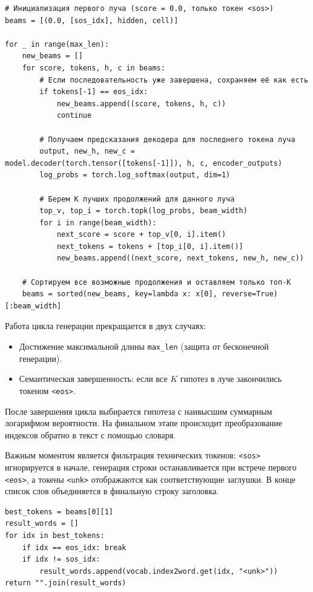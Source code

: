 \documentclass[coursework]{SCWorks}
\begin{document}
    \begin{verbatim}
# Инициализация первого луча (score = 0.0, только токен <sos>)
beams = [(0.0, [sos_idx], hidden, cell)]

for _ in range(max_len):
    new_beams = []
    for score, tokens, h, c in beams:
        # Если последовательность уже завершена, сохраняем её как есть
        if tokens[-1] == eos_idx:
            new_beams.append((score, tokens, h, c))
            continue

        # Получаем предсказания декодера для последнего токена луча
        output, new_h, new_c = model.decoder(torch.tensor([tokens[-1]]), h, c, encoder_outputs)
        log_probs = torch.log_softmax(output, dim=1)

        # Берем K лучших продолжений для данного луча
        top_v, top_i = torch.topk(log_probs, beam_width)
        for i in range(beam_width):
            next_score = score + top_v[0, i].item()
            next_tokens = tokens + [top_i[0, i].item()]
            new_beams.append((next_score, next_tokens, new_h, new_c))

    # Сортируем все возможные продолжения и оставляем только топ-K
    beams = sorted(new_beams, key=lambda x: x[0], reverse=True)[:beam_width]
    \end{verbatim}

    Работа цикла генерации прекращается в двух случаях:
    \begin{itemize}
        \item Достижение максимальной длины \texttt{max\_len} (защита от бесконечной генерации).
        \item Семантическая завершенность: если все $K$ гипотез в луче закончились токеном \texttt{<eos>}.
    \end{itemize}

    После завершения цикла выбирается гипотеза с наивысшим суммарным логарифмом вероятности.
    На финальном этапе происходит преобразование индексов обратно в текст с помощью словаря.

    Важным моментом является фильтрация технических токенов: \texttt{<sos>} игнорируется в начале,
    генерация строки останавливается при встрече первого \texttt{<eos>},
    а токены \texttt{<unk>} отображаются как соответствующие заглушки.
    В конце список слов объединяется в финальную строку заголовка.

    \begin{verbatim}
best_tokens = beams[0][1]
result_words = []
for idx in best_tokens:
    if idx == eos_idx: break
    if idx != sos_idx:
        result_words.append(vocab.index2word.get(idx, "<unk>"))
return "".join(result_words)
    \end{verbatim}
\end{document}
